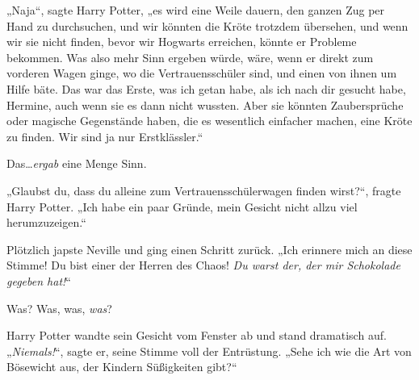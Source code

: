 „Naja“, sagte Harry Potter, „es wird eine Weile dauern, den ganzen Zug per Hand zu durchsuchen, und wir könnten die Kröte trotzdem übersehen, und wenn wir sie nicht finden, bevor wir Hogwarts erreichen, könnte er Probleme bekommen. Was also mehr Sinn ergeben würde, wäre, wenn er direkt zum vorderen Wagen ginge, wo die Vertrauensschüler sind, und einen von ihnen um Hilfe bäte. Das war das Erste, was ich getan habe, als ich nach dir gesucht habe, Hermine, auch wenn sie es dann nicht wussten. Aber sie könnten Zaubersprüche oder magische Gegenstände haben, die es wesentlich einfacher machen, eine Kröte zu finden. Wir sind ja nur Erstklässler.“

Das…\emph{ergab} eine Menge Sinn.

„Glaubst du, dass du alleine zum Vertrauensschülerwagen finden wirst?“, fragte Harry Potter. „Ich habe ein paar Gründe, mein Gesicht nicht allzu viel herumzuzeigen.“

Plötzlich japste Neville und ging einen Schritt zurück. „Ich erinnere mich an diese Stimme! Du bist einer der Herren des Chaos! \emph{Du warst der, der mir Schokolade gegeben hat!}“

Was? Was, was, \emph{was}?

Harry Potter wandte sein Gesicht vom Fenster ab und stand dramatisch auf. „\emph{Niemals!}“, sagte er, seine Stimme voll der Entrüstung. „Sehe ich wie die Art von Bösewicht aus, der Kindern Süßigkeiten gibt?“

